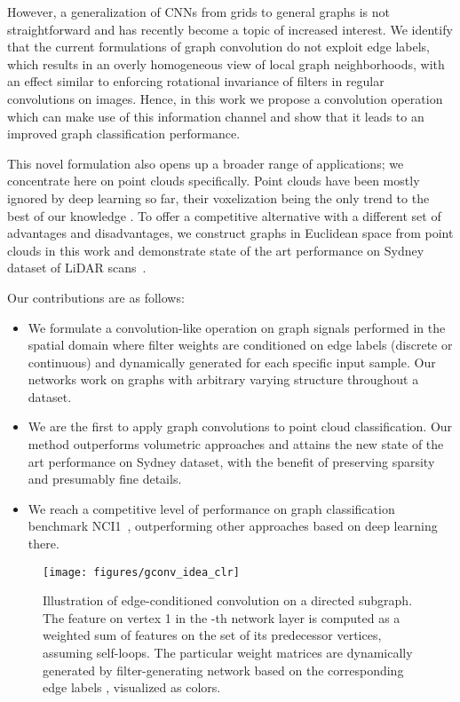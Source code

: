 \documentclass[10pt,twocolumn,letterpaper]{article}
\begin{document}
However, a generalization of CNNs from grids to general graphs is not straightforward and has recently become a topic of increased interest. We identify that the current formulations of graph convolution do not exploit edge labels, which results in an overly homogeneous view of local graph neighborhoods, with an effect similar to enforcing rotational invariance of filters in regular convolutions on images. Hence, in this work we propose a convolution operation which can make use of this information channel and show that it leads to an improved graph classification performance.

This novel formulation also opens up a broader range of applications; we concentrate here on point clouds specifically. Point clouds have been mostly ignored by deep learning so far, their voxelization being the only trend to the best of our knowledge \cite{voxnet,pclabeling16}. To offer a competitive alternative with a different set of advantages and disadvantages, we construct graphs in Euclidean space from point clouds in this work and demonstrate state of the art performance on Sydney dataset of LiDAR scans~\cite{trianglesvm}.

Our contributions are as follows:

\begin{itemize}
\item We formulate a convolution-like operation on graph signals performed in the spatial domain where filter weights are conditioned on edge labels (discrete or continuous) and dynamically generated for each specific input sample. Our networks work on graphs with arbitrary varying structure throughout a dataset.
\item We are the first to apply graph convolutions to point cloud classification. Our method outperforms volumetric approaches and attains the new state of the art performance on Sydney dataset, with the benefit of preserving sparsity and presumably fine details.
\item We reach a competitive level of performance on graph classification benchmark NCI1~\cite{nci1db}, outperforming other approaches based on deep learning there.
\end{itemize}

\begin{figure*}[ht]
\centering
\texttt{[image: figures/gconv\_idea\_clr]}
\vspace{1.5ex}
\caption{\label{fig:gconv} Illustration of edge-conditioned convolution on a directed subgraph. The feature  on vertex 1 in the -th network layer is computed as a weighted sum of features  on the set of its predecessor vertices, assuming self-loops. The particular weight matrices are dynamically generated by filter-generating network  based on the corresponding edge labels , visualized as colors.}
\end{figure*}
\end{document}
